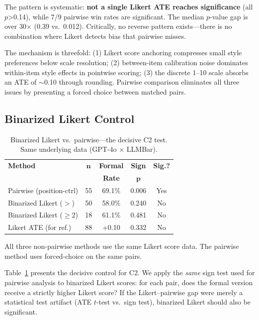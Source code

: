 \documentclass[11pt,a4paper]{article}
\begin{document}
The pattern is systematic: \textbf{not a single Likert ATE reaches significance} (all $p$>0.14), while 7/9 pairwise win rates are significant.
The median $p$-value gap is over 30$\times$ (0.39 vs.\ 0.012).
Critically, no reverse pattern exists---there is no combination where Likert detects bias that pairwise misses.

The mechanism is threefold: (1) Likert score anchoring compresses small style preferences below scale resolution; (2) between-item calibration noise dominates within-item style effects in pointwise scoring; (3) the discrete 1--10 scale absorbs an ATE of $\sim$0.10 through rounding.
Pairwise comparison eliminates all three issues by presenting a forced choice between matched pairs.

\subsection{Binarized Likert Control}

\begin{table}[t]
\centering
\small
\caption{Binarized Likert vs.\ pairwise---the decisive C2 test. Same underlying data (GPT-4o $\times$ LLMBar).}
\label{tab:binarized}
\begin{tabular}{lcccc}
\toprule
\textbf{Method} & $\bm{n}$ & \textbf{Formal} & \textbf{Sign} & \textbf{Sig.?} \\
 & & \textbf{Rate} & $\bm{p}$ & \\
\midrule
Pairwise (position-ctrl) & 55 & 69.1\% & 0.006 & Yes \\
Binarized Likert ($>$)   & 50 & 58.0\% & 0.240 & No  \\
Binarized Likert ($\geq$2) & 18 & 61.1\% & 0.481 & No  \\
\midrule
Likert ATE (for ref.)     & 88 & +0.10  & 0.332 & No  \\
\bottomrule
\end{tabular}
\begin{flushleft}
\footnotesize All three non-pairwise methods use the same Likert score data. The pairwise method uses forced-choice on the same pairs.
\end{flushleft}
\end{table}

Table~\ref{tab:binarized} presents the decisive control for C2.
We apply the \emph{same} sign test used for pairwise analysis to binarized Likert scores: for each pair, does the formal version receive a strictly higher Likert score?
If the Likert--pairwise gap were merely a statistical test artifact (ATE $t$-test vs.\ sign test), binarized Likert should also be significant.
\end{document}

